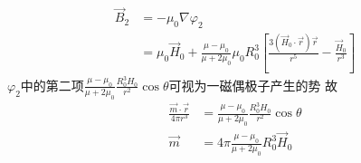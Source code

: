 \documentclass{phyasgn}
\begin{document}
\begin{sol}[5]
    \begin{align*}
        \vec{B}_2&=-\mu_0\nabla\varphi_2\\
        &=\mu_0\vec{H}_0+\frac{\mu-\mu_0}{\mu+2\mu_0}\mu_0R_0^3\left[\frac{3(\vec{H}_0\cdot\vec{r})\vec{r}}{r^5}-\frac{\vec{H}_0}{r^3}\right]
    \end{align*}
    $\varphi_2$中的第二项$\frac{\mu-\mu_0}{\mu+2\mu_0}\frac{R_0^3H_0}{r^2}\cos\theta$可视为一磁偶极子产生的势
    故
    \begin{align*}
        \frac{\vec{m}\cdot\vec{r}}{4\pi r^3}&=\frac{\mu-\mu_0}{\mu+2\mu_0}\frac{R_0^3H_0}{r^2}\cos\theta\\
        \vec{m}&=4\pi\frac{\mu-\mu_0}{\mu+2\mu_0}R_0^3\vec{H}_0
    \end{align*}
\end{sol}
\end{document}
